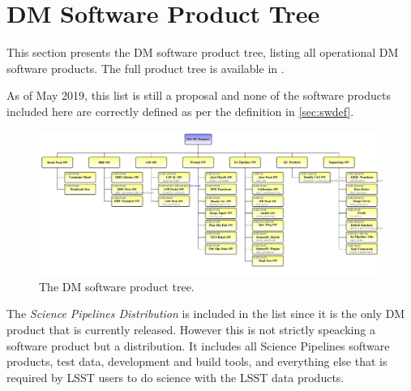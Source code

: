 \newpage
\section{DM Software Product Tree}\label{sec:swptree}

This section presents the \gls{DM} software product tree, listing all operational \gls{DM} software products.
The full product tree is available in .

As of May 2019, this list is still a proposal and none of the software products included here are correctly defined as per the definition in \ref{sec:swdef}.



\begin{figure}
\begin{center}
 \includegraphics[width=1.1\textwidth]{ProductTreeLand}

 \caption{The \gls{DM} software product tree.}
 \label{fig:doctree}

\end{center}
\end{figure}

The \textit{Science Pipelines Distribution} is included in the list since it is the only \gls{DM} product that is currently released.
However this is not strictly speacking a software product but a distribution.
It includes all Science Pipelines software products, test data, development and build tools, and everything else that is required by \gls{LSST} users to do science with the \gls{LSST} data products.
